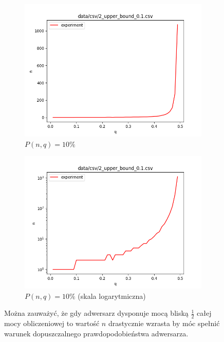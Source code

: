 \documentclass[a4paper,11pt]{article}
\theoremstyle{mytheor}
\begin{document}
\begin{figure}[H]
    \begin{subfigure}{0.5\textwidth}
        \includegraphics[width=1.0\linewidth]{2_upper_bound_0.1.png}
        \caption{$P(n, q) = 10\%$}
        \label{fig:subim1}
    \end{subfigure}
    \begin{subfigure}{0.5\textwidth}
        \includegraphics[width=1.0\linewidth]{2_upper_bound_log_0.1.png}
        \caption{$P(n, q) = 10\%$ (skala logarytmiczna)}
        \label{fig:subim1}
    \end{subfigure}

    \caption{Można zauważyć, że gdy adwersarz dysponuje mocą bliską $\frac{1}{2}$ całej mocy obliczeniowej to wartość $n$ drastycznie wzrasta by móc spełnić warunek dopuszczalnego prawdopodobieństwa adwersarza.}
    \label{fig:data2}
\end{figure}
\end{document}
